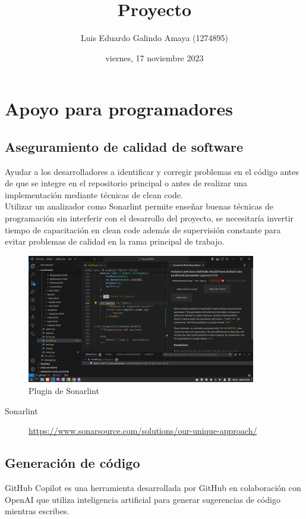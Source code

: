 \documentclass[11pt]{article}
\author{Luis Eduardo Galindo Amaya (1274895)}
\date{viernes, 17 noviembre 2023}
\title{Proyecto}
\begin{document}
\tableofcontents
\pagebreak

\section{Apoyo para programadores}
\label{sec:org75559d5}
\subsection{Aseguramiento de calidad de software}
\label{sec:org75d9a82}
Ayudar a los desarrolladores a identificar y corregir problemas en el
código antes de que se integre en el repositorio principal o antes de
realizar una implementación mediante técnicas de clean code. \\

Utilizar un analizador como Sonarlint permite enseñar buenas
técnicas de programación sin interferir con el desarrollo del proyecto,
se necesitaría invertir tiempo de capacitación en clean code además de
supervisión constante para evitar problemas de calidad en la rama
principal de trabajo.

\begin{figure}[htbp]
\centering
\includegraphics[width=10cm]{img/Captura de pantalla de 2023-11-17 20-43-45.png}
\caption{Plugin de Sonarlint}
\end{figure}

\begin{description}
\item[{Sonarlint}] \url{https://www.sonarsource.com/solutions/our-unique-approach/}
\end{description}

\pagebreak

\subsection{Generación de código}
\label{sec:orgde0634f}
GitHub Copilot es una herramienta desarrollada por GitHub en
colaboración con OpenAI que utiliza inteligencia artificial para
generar sugerencias de código mientras escribes. \\
\end{document}
